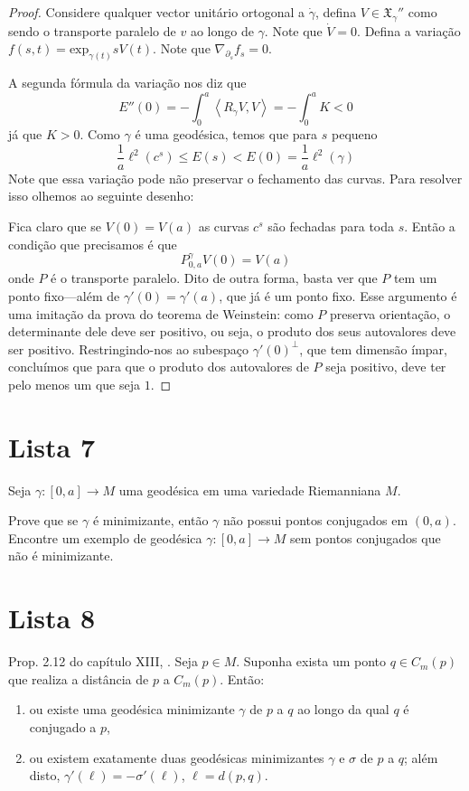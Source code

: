 \begin{proof}
Considere qualquer vector unitário ortogonal
a $\dot \gamma$, defina $V\in
\mathfrak{X}_{\gamma}''$ como sendo o
transporte paralelo de $v$ ao longo de
$\gamma$. Note que $\dot V=0$. Defina a
variação
$f(s,t)=\text{exp}_{\gamma(t)}sV(t)$. Note
que
$\nabla_{\partial_s}f_s=0$.

A segunda fórmula da variação nos diz que
\[E''(0)=-\int_0^a \left\langle{}R_{\dot
\gamma}V,V\right\rangle{}=-\int_0^a K<0\] já que
$K>0$. Como $\gamma$ é uma geodésica,
temos que para $s$ pequeno
\[\frac{1}{a}\ell^2(c^s)\leq E(s) < E(0)=
\frac{1}{a}\ell^2(\gamma)\] Note que essa
variação pode não preservar o
fechamento das curvas. Para resolver isso
olhemos ao seguinte desenho:

Fica claro que se $V(0)=V(a)$ as curvas $c^s$
são fechadas para toda $s$. Então
a condição que precisamos é que
\[P^\gamma_{0,a}V(0)=V(a)\] onde $P$ é o
transporte paralelo. Dito de outra forma,
basta ver que $P$ tem um ponto
fixo---além de $\gamma'(0)=\gamma'(a)$, que
já é um ponto fixo. Esse argumento é
uma imitação da prova do teorema de
Weinstein: como $P$ preserva orientação, o
determinante dele deve ser positivo, ou seja,
o produto dos seus autovalores
deve ser positivo. Restringindo-nos ao
subespaço $\gamma'(0)^\perp$, que tem
dimensão ímpar, concluímos que para que o
produto dos autovalores de $P$ seja
positivo, deve ter pelo menos um que seja
$1$.
\end{proof}

\section{Lista 7}
\label{section-lista-7}

\begin{exercise}
\label{exercise-minim-impli-no-conju-point}
Seja $\gamma:[0,a]\to M$ uma geodésica em uma
variedade Riemanniana $M$.

 Prove que se $\gamma$ é minimizante, então
 $\gamma$ não possui pontos
 conjugados em  $(0,a)$. Encontre um exemplo
 de geodésica $\gamma:[0,a] \to M$
sem pontos conjugados que não é minimizante.
\end{exercise}

\section{Lista 8}
\label{section-lista-8}

\begin{exercise}
\label{exercise-l8-1}
Prop. 2.12 do capítulo XIII, \cite{doc}. Seja
$p \in M$.
Suponha exista um ponto $q \in C_m(p)$ que
realiza a distância de $p$ a
$C_m(p)$. Então:
\begin{enumerate}
\item ou existe uma geodésica
minimizante $\gamma$ de $p$ a $q$ ao longo da
qual $q$ é
conjugado a $p$,
\item ou existem exatamente duas geodésicas
minimizantes $\gamma$ e $\sigma$ de $p$ a
$q$; além disto,
$\gamma'(\ell)=-\sigma'(\ell)$,
$\ell=d(p,q)$.
\end{enumerate}
\end{exercise}

